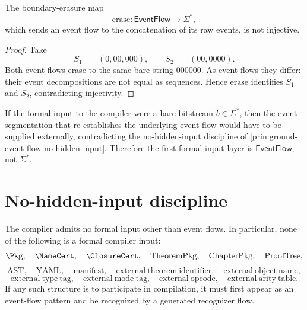 \begin{proposition}
\label{prop:ground-event-flow-erasure-not-injective}
The boundary-erasure map
$$
  \mathrm{erase} \colon \mathsf{EventFlow} \longrightarrow \Sigma^{*},
$$
which sends an event flow to the concatenation of its raw events, is not injective.
\end{proposition}

\begin{proof}
Take
$$
  S_{1} \;=\; (0, 00, 000),
  \qquad
  S_{2} \;=\; (00, 0000).
$$
Both event flows erase to the same bare string $000000$. As event flows they differ: their event decompositions are not equal as sequences. Hence $\mathrm{erase}$ identifies $S_{1}$ and $S_{2}$, contradicting injectivity.
\end{proof}

\begin{corollary}
\label{cor:ground-event-flow-input-not-bare-bitstream}
If the formal input to the compiler were a bare bitstream $b \in \Sigma^{*}$, then the event segmentation that re-establishes the underlying event flow would have to be supplied externally, contradicting the no-hidden-input discipline of \autoref{prin:ground-event-flow-no-hidden-input}. Therefore the first formal input layer is $\mathsf{EventFlow}$, not $\Sigma^{*}$.
\end{corollary}

\section{No-hidden-input discipline}
\label{sec:ground-event-flow-no-hidden-input}

\begin{principle}
\label{prin:ground-event-flow-no-hidden-input}
The compiler admits no formal input other than event flows. In particular, none of the following is a formal compiler input:
$$
  \Pkg, \quad
  \NameCert, \quad
  \ClosureCert, \quad
  \mathrm{TheoremPkg}, \quad
  \mathrm{ChapterPkg}, \quad
  \mathrm{ProofTree},
$$
$$
  \mathrm{AST}, \quad
  \mathrm{YAML}, \quad
  \mathrm{manifest}, \quad
  \mathrm{external\ theorem\ identifier}, \quad
  \mathrm{external\ object\ name},
$$
$$
  \mathrm{external\ type\ tag}, \quad
  \mathrm{external\ mode\ tag}, \quad
  \mathrm{external\ opcode}, \quad
  \mathrm{external\ arity\ table}.
$$
If any such structure is to participate in compilation, it must first appear as an event-flow pattern and be recognized by a generated recognizer flow.
\end{principle}

